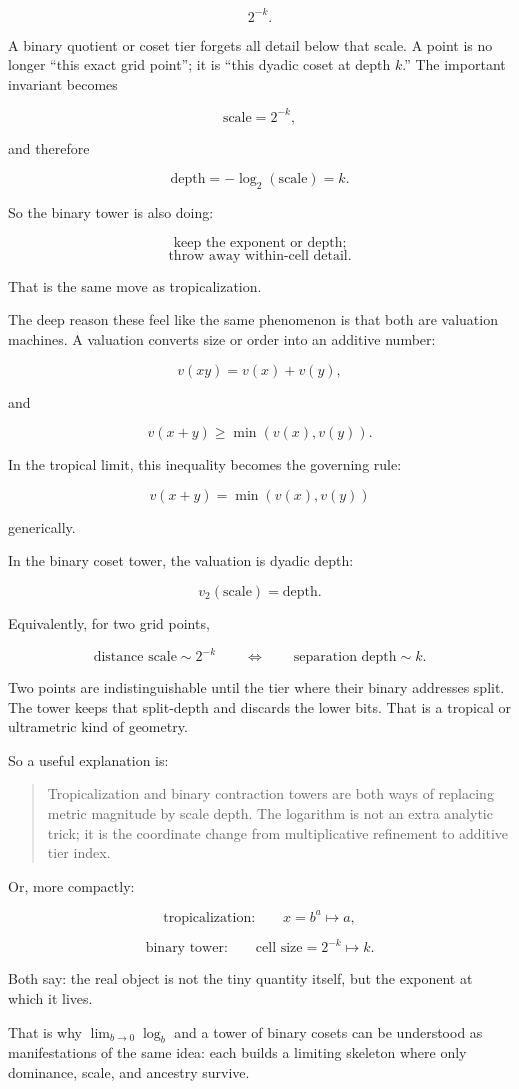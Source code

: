 \documentclass[11pt]{article}
\begin{document}
\[
2^{-k}.
\]

A binary quotient or coset tier forgets all detail below that scale. A point is
no longer ``this exact grid point''; it is ``this dyadic coset at depth \(k\).''
The important invariant becomes

\[
\text{scale} = 2^{-k},
\]

and therefore

\[
\text{depth} = -\log_2(\text{scale}) = k.
\]

So the binary tower is also doing:

\[
\text{keep the exponent or depth;}
\]
\[
\text{throw away within-cell detail.}
\]

That is the same move as tropicalization.

The deep reason these feel like the same phenomenon is that both are valuation
machines. A valuation converts size or order into an additive number:

\[
v(xy) = v(x) + v(y),
\]

and

\[
v(x+y) \geq \min(v(x),v(y)).
\]

In the tropical limit, this inequality becomes the governing rule:

\[
v(x+y) = \min(v(x),v(y))
\]

generically.

In the binary coset tower, the valuation is dyadic depth:

\[
v_2(\text{scale}) = \text{depth}.
\]

Equivalently, for two grid points,

\[
\text{distance scale} \sim 2^{-k}
\qquad\Longleftrightarrow\qquad
\text{separation depth} \sim k.
\]

Two points are indistinguishable until the tier where their binary addresses
split. The tower keeps that split-depth and discards the lower bits. That is a
tropical or ultrametric kind of geometry.

So a useful explanation is:

\begin{quote}
Tropicalization and binary contraction towers are both ways of replacing metric
magnitude by scale depth. The logarithm is not an extra analytic trick; it is
the coordinate change from multiplicative refinement to additive tier index.
\end{quote}

Or, more compactly:

\[
\text{tropicalization:}\qquad x=b^a \longmapsto a,
\]

\[
\text{binary tower:}\qquad \text{cell size}=2^{-k} \longmapsto k.
\]

Both say: the real object is not the tiny quantity itself, but the exponent at
which it lives.

That is why \(\lim_{b\to 0}\log_b\) and a tower of binary cosets can be
understood as manifestations of the same idea: each builds a limiting skeleton
where only dominance, scale, and ancestry survive.
\end{document}
